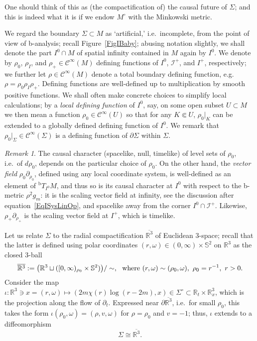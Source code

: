 \documentclass[reqno,11pt,letterpaper]{amsart}
\numberwithin{equation}{section}
\numberwithin{figure}{section}
\theoremstyle{definition}
\theoremstyle{remark}
\newtheorem{rmk}[thm]{Remark}
\newcommand{\mc}{\mathcal}
\newcommand{\cC}{\mc C}
\newcommand{\ms}{\mathscr}
\newcommand{\scri}{\ms I}
\newcommand{\R}{\mathbb{R}}
\newcommand{\Sph}{\mathbb{S}}
\newcommand{\ol}{\overline}
\newcommand{\pa}{\partial}
\newcommand{\tn}{\textnormal}
\newcommand{\bop}{{\mathrm{b}}}
\newcommand{\Tb}{{}^{\bop}T}
\newcommand{\CI}{\cC^\infty}
\begin{document}
One should think of this as (the compactification of) the causal future of $\Sigma$; and this is indeed what it is if we endow $M^\circ$ with the Minkowski metric.

We regard the boundary $\Sigma\subset M$ as `artificial,' i.e.\ incomplete, from the point of view of b-analysis; recall Figure~\ref{FigIBaby}; abusing notation slightly, we shall denote the part $I^0\cap M$ of spatial infinity contained in $M$ again by $I^0$. We denote by $\rho_0$, $\rho_I$, and $\rho_+\in\CI(M)$ defining functions of $I^0$, $\scri^+$, and $I^+$, respectively; we further let $\rho\in\CI(M)$ denote a total boundary defining function, e.g.\ $\rho=\rho_0\rho_I\rho_+$. Defining functions are well-defined up to multiplication by smooth positive functions. We shall often make concrete choices to simplify local calculations; by a \emph{local defining function} of $I^0$, say, on some open subset $U\subset M$ we then mean a function $\rho_0\in\CI(U)$ so that for any $K\Subset U$, $\rho_0|_K$ can be extended to a globally defined defining function of $I^0$. We remark that $\rho_0|_\Sigma\in\CI(\Sigma)$ is a defining function of $\pa\Sigma$ within $\Sigma$.

\begin{rmk}
\label{RmkCptABdfChar}
  The causal character (spacelike, null, timelike) of level sets of $\rho_0$, i.e.\ of $d\rho_0$, depends on the particular choice of $\rho_0$. On the other hand, the \emph{vector field} $\rho_0\pa_{\rho_0}$, defined using any local coordinate system, is well-defined as an element of $\Tb_{I^0}M$, and thus so is its causal character at $I^0$ with respect to the b-metric $\rho^2 g_m$: it is the scaling vector field at infinity, see the discussion after equation~\eqref{EqISysLinOp}, and spacelike away from the corner $I^0\cap\scri^+$. Likewise, $\rho_+\pa_{\rho_+}$ is the scaling vector field at $I^+$, which is timelike.
\end{rmk}

Let us relate $\Sigma$ to the radial compactification $\ol{\R^3}$ of Euclidean $3$-space; recall that the latter is defined using polar coordinates $(r,\omega)\in(0,\infty)\times\Sph^2$ on $\R^3$ as the closed $3$-ball
\[
  \ol{\R^3} := \bigl(\R^3 \sqcup ([0,\infty)_{\rho_0}\times\Sph^2)\bigr) / \sim,\ \ 
  \tn{where}\ (r,\omega) \sim (\rho_0,\omega),\ \rho_0=r^{-1},\ r>0.
\]
Consider the map $\iota\colon\R^3\ni x=(r,\omega)\mapsto(2 m\chi(r)\log(r-2 m),x)\in\Sigma^\circ\subset\R_t\times\R^3_x$, which is the projection along the flow of $\pa_t$. Expressed near $\pa\ol{\R^3}$, i.e.\ for small $\rho_0$, this takes the form $\iota(\rho_0,\omega)=(\rho,v,\omega)$ for $\rho=\rho_0$ and $v=-1$; thus, $\iota$ extends to a diffeomorphism
\begin{equation}
\label{EqCptASigmaR3}
  \Sigma \cong \ol{\R^3}.
\end{equation}
\end{document}
